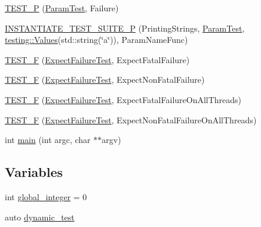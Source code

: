 \begin{DoxyCompactItemize}
\item 
\mbox{\hyperlink{_obj__test_2lib_2googletest-master_2googletest_2test_2googletest-output-test___8cc_a0847a99be23b980115e2dd88a1bd60cc}{T\+E\+S\+T\+\_\+P}} (\mbox{\hyperlink{class_param_test}{Param\+Test}}, Failure)
\item 
\mbox{\hyperlink{_obj__test_2lib_2googletest-master_2googletest_2test_2googletest-output-test___8cc_a5c488fe4474fec68c24acfc4fb353ed7}{I\+N\+S\+T\+A\+N\+T\+I\+A\+T\+E\+\_\+\+T\+E\+S\+T\+\_\+\+S\+U\+I\+T\+E\+\_\+P}} (Printing\+Strings, \mbox{\hyperlink{class_param_test}{Param\+Test}}, \mbox{\hyperlink{namespacetesting_abd3c87b40c2a0663691c9b617ed5fcc2}{testing\+::\+Values}}(std\+::string(\char`\"{}a\char`\"{})), Param\+Name\+Func)
\item 
\mbox{\hyperlink{_obj__test_2lib_2googletest-master_2googletest_2test_2googletest-output-test___8cc_ae7459e6b9516821fd0e77eb3aa9b7413}{T\+E\+S\+T\+\_\+F}} (\mbox{\hyperlink{class_expect_failure_test}{Expect\+Failure\+Test}}, Expect\+Fatal\+Failure)
\item 
\mbox{\hyperlink{_obj__test_2lib_2googletest-master_2googletest_2test_2googletest-output-test___8cc_abec150ac715359c89fde1102cfc300d2}{T\+E\+S\+T\+\_\+F}} (\mbox{\hyperlink{class_expect_failure_test}{Expect\+Failure\+Test}}, Expect\+Non\+Fatal\+Failure)
\item 
\mbox{\hyperlink{_obj__test_2lib_2googletest-master_2googletest_2test_2googletest-output-test___8cc_a1f29562e9248524dda90aa6d641d77ea}{T\+E\+S\+T\+\_\+F}} (\mbox{\hyperlink{class_expect_failure_test}{Expect\+Failure\+Test}}, Expect\+Fatal\+Failure\+On\+All\+Threads)
\item 
\mbox{\hyperlink{_obj__test_2lib_2googletest-master_2googletest_2test_2googletest-output-test___8cc_a7714d1899711a604704737897595e7c3}{T\+E\+S\+T\+\_\+F}} (\mbox{\hyperlink{class_expect_failure_test}{Expect\+Failure\+Test}}, Expect\+Non\+Fatal\+Failure\+On\+All\+Threads)
\item 
int \mbox{\hyperlink{_obj__test_2lib_2googletest-master_2googletest_2test_2googletest-output-test___8cc_a3c04138a5bfe5d72780bb7e82a18e627}{main}} (int argc, char $\ast$$\ast$argv)
\end{DoxyCompactItemize}
\subsection*{Variables}
\begin{DoxyCompactItemize}
\item 
int \mbox{\hyperlink{_obj__test_2lib_2googletest-master_2googletest_2test_2googletest-output-test___8cc_a81be7f35ea2573ecc7ca08b26b56bccf}{global\+\_\+integer}} = 0
\item 
auto \mbox{\hyperlink{_obj__test_2lib_2googletest-master_2googletest_2test_2googletest-output-test___8cc_af938c5e98ea6bb8c43a7bd0d8d3007b5}{dynamic\+\_\+test}}
\end{DoxyCompactItemize}


